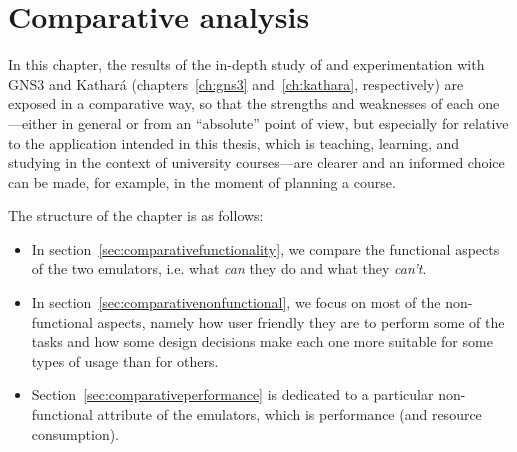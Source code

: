 
\chapter{Comparative analysis}
\label{ch:comparative}

In this chapter, the results of the in-depth study of and experimentation with GNS3 and Kathará (chapters~\ref{ch:gns3} and~\ref{ch:kathara}, respectively) are exposed in a comparative way, so that the strengths and weaknesses of each one---either in general or from an ``absolute'' point of view, but especially for relative to the application intended in this thesis, which is teaching, learning, and studying in the context of university courses---are clearer and an informed choice can be made, for example, in the moment of planning a course.

The structure of the chapter is as follows:
\begin{itemize}
  \item In section~\ref{sec:comparativefunctionality}, we compare the functional aspects of the two emulators, i.e. what \emph{can} they do and what they \emph{can't}.
  \item In section~\ref{sec:comparativenonfunctional}, we focus on most of the non-functional aspects, namely how user friendly they are to perform some of the tasks and how some design decisions make each one more suitable for some types of usage than for others.
  \item Section~\ref{sec:comparativeperformance} is dedicated to a particular non-functional attribute of the emulators, which is performance (and resource consumption).
\end{itemize}







